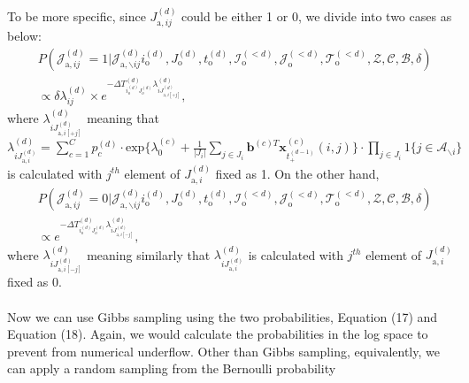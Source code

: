 \documentclass[a4paper]{article}
\begin{document}
To be more specific, since ${J}^{(d)}_{\mbox{a}, ij}$ could be either 1 or 0, we divide into two cases as below:
      \begin{equation}
      \begin{aligned}
      &P(\mathcal{J}^{(d)}_{\mbox{a}, ij}=1| \mathcal{J}^{(d)}_{\mbox{a}, \backslash ij}  i^{(d)}_{\mbox{o}}, J^{(d)}_{\mbox{o}}, t^{(d)}_{\mbox{o}}, \mathcal{I}^{(<d)}_{\mbox{o}}, \mathcal{J}^{(<d)}_{\mbox{o}}, \mathcal{T}^{(<d)}_{\mbox{o}}, \mathcal{Z}, \mathcal{C}, \mathcal{B}, \delta)\\& \propto \delta\lambda^{(d)}_{ij}\times e^{-\Delta T^{(d)}_{i_o^{(d)}J_o^{(d)}}\lambda^{(d)}_{iJ^{(d)}_{\mbox{a}, i[+j]}}},
      \end{aligned}
      \end{equation}
      where $\lambda^{(d)}_{iJ^{(d)}_{\mbox{a}, i[+j]}}$ meaning that $\lambda^{(d)}_{iJ^{(d)}_{\mbox{a}, i}}=\sum\limits_{c=1}^{C} p^{(d)}_c\cdot\mbox{exp}\Big\{\lambda_0^{(c)}+\frac{1}{|J_i|}\sum\limits_{j \in{J_i}}\boldsymbol{b}^{(c)T}\boldsymbol{x}^{(c)}_{t^{(d-1)}_+}(i, j)\Big\}\cdot \prod\limits_{j \in J_i}1\{j \in \mathcal{A}_{\backslash i}\}$ is calculated with $j^{th}$ element of $J_{\mbox{a}, i}^{(d)}$ fixed as 1. On the other hand, 
     \begin{equation}
     \begin{aligned}
     &P(\mathcal{J}^{(d)}_{\mbox{a}, ij}=0| \mathcal{J}^{(d)}_{\mbox{a}, \backslash ij}  i^{(d)}_{\mbox{o}}, J^{(d)}_{\mbox{o}}, t^{(d)}_{\mbox{o}}, \mathcal{I}^{(<d)}_{\mbox{o}}, \mathcal{J}^{(<d)}_{\mbox{o}}, \mathcal{T}^{(<d)}_{\mbox{o}}, \mathcal{Z}, \mathcal{C}, \mathcal{B}, \delta)\\& \propto e^{-\Delta T^{(d)}_{i_o^{(d)}J_o^{(d)}}\lambda^{(d)}_{iJ^{(d)}_{\mbox{a}, i[-j]}}},
     \end{aligned}
     \end{equation}
       where $\lambda^{(d)}_{iJ^{(d)}_{\mbox{a}, i[-j]}}$ meaning similarly that $\lambda^{(d)}_{iJ^{(d)}_{\mbox{a}, i}}$ is calculated with $j^{th}$ element of $J_{\mbox{a}, i}^{(d)}$ fixed as 0. \\\\ \newline Now we can use Gibbs sampling using the two probabilities, Equation (17) and Equation (18). Again, we would calculate the probabilities in the log space to prevent from numerical underflow. Other than Gibbs sampling, equivalently, we can apply a random sampling from the Bernoulli probability
\end{document}
